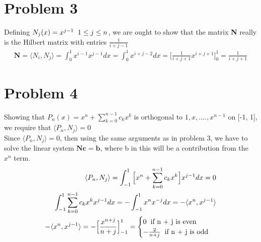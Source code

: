 \documentclass[a4paper,norsk]{article}
\begin{document}
\section*{Problem 3}
Defining $N_j(x) = x^{j-1} \hspace{2mm} 1 \leq j \leq n$, we are ought to show that the matrix \textbf{N} really is the Hilbert matrix with entries $\frac{1}{i + j - 1}$
\begin{align}
\mathbf{N} = \langle N_i, N_j \rangle = \int_0^1 x^{i - 1} x^{j - 1} dx = \int_0^1 x^{i + j- 2} dx = \Big[\frac{1}{i+j+1} x^{i+j+1} \Big]_0^1 = \frac{1}{i+j+1} 
\end{align}

\section*{Problem 4}
Showing that $P_n(x) = x^n + \sum_{k=0}^{n-1} c_k x^k$ is orthogonal to $1, x, ...., x^{n-1}$ on [-1, 1], we require that $\langle P_n,  N_j\rangle = 0$ \\
Since $\langle P_n,  N_j\rangle = 0$, then using the same arguments as in problem 3, we have to solve the linear system $\mathbf{Nc = b}$, where b in this will be a contribution from the $x^n$ term.
\begin{align}
\langle P_n,  N_j\rangle = \int_{-1}^1  \Big[x^n + \sum_{k=0}^{n-1} c_k x^k\Big]x^{j-1} dx = 0 \\
 \int_{-1}^1 \sum_{k=0}^{n-1} c_k x^k x^{j-1} dx = -\int_{-1}^1  x^n x^{-j} dx = -\langle x^n, x^{j-1}\rangle \\
 -\langle x^n, x^{j-1}\rangle = -\Big[\frac{x^{n+j} }{n+j} \Big]_{-1}^1  = 
 \begin{cases} 
      0 \hspace{2mm} \text{if n + j is even } \\
      -\frac{2}{n+j} \hspace{2mm} \text{if n + j is odd}
   \end{cases}
\end{align}
\end{document}
